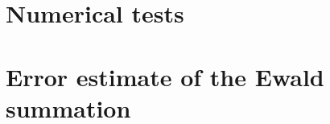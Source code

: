 \documentclass[aps,pre,preprint]{revtex4-1}
\begin{document}
\section{Numerical tests}




\newpage
\appendix
\section{Error estimate of the Ewald summation}




\newpage

{}

\end{document}
